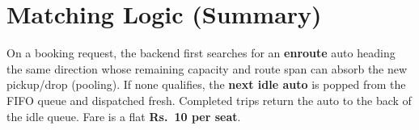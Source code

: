 \documentclass[11pt,a4paper]{article}
\begin{document}
\section{Matching Logic (Summary)}
On a booking request, the backend first searches for an \textbf{enroute} auto heading
the same direction whose remaining capacity and route span can absorb the new
pickup/drop (pooling). If none qualifies, the \textbf{next idle auto} is popped from
the FIFO queue and dispatched fresh. Completed trips return the auto to the back of
the idle queue. Fare is a flat \textbf{Rs.\ 10 per seat}.
\end{document}
